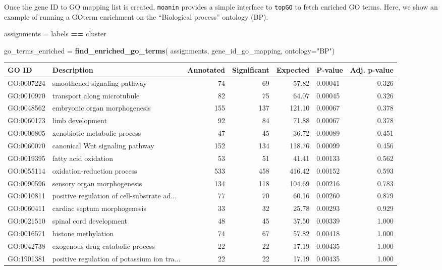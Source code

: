 \documentclass[9pt,a4paper,]{extarticle}
\newenvironment{Shaded}{\begin{snugshade}}{\end{snugshade}}
\newcommand{\DataTypeTok}[1]{\textcolor[rgb]{0.13,0.29,0.53}{#1}}
\newcommand{\KeywordTok}[1]{\textcolor[rgb]{0.13,0.29,0.53}{\textbf{#1}}}
\newcommand{\NormalTok}[1]{#1}
\newcommand{\OperatorTok}[1]{\textcolor[rgb]{0.81,0.36,0.00}{\textbf{#1}}}
\newcommand{\StringTok}[1]{\textcolor[rgb]{0.31,0.60,0.02}{#1}}
\begin{document}
Once the gene ID to GO mapping list is created, \texttt{moanin} provides a simple
interface to \texttt{topGO} to fetch enriched GO terms. Here, we show an example of
running a GOterm enrichment on the ``Biological process'' ontology (BP).

\begin{Shaded}
\begin{Highlighting}[]
\NormalTok{assignments =}\StringTok{ }\NormalTok{labels }\OperatorTok{==}\StringTok{ }\NormalTok{cluster}

\NormalTok{go_terms_enriched =}\StringTok{ }\KeywordTok{find_enriched_go_terms}\NormalTok{(}
\NormalTok{    assignments,}
\NormalTok{    gene_id_go_mapping, }\DataTypeTok{ontology=}\StringTok{"BP"}\NormalTok{)}
\end{Highlighting}
\end{Shaded}

\begin{tabular}{llrrrlr}
\toprule
GO ID & Description & Annotated & Significant & Expected & P-value & Adj. p-value\\
\midrule
GO:0007224 & smoothened signaling pathway & 74 & 69 & 57.82 & 0.00041 & 0.326\\
GO:0010970 & transport along microtubule & 82 & 75 & 64.07 & 0.00045 & 0.326\\
GO:0048562 & embryonic organ morphogenesis & 155 & 137 & 121.10 & 0.00067 & 0.378\\
GO:0060173 & limb development & 92 & 84 & 71.88 & 0.00067 & 0.378\\
GO:0006805 & xenobiotic metabolic process & 47 & 45 & 36.72 & 0.00089 & 0.451\\
\addlinespace
GO:0060070 & canonical Wnt signaling pathway & 152 & 134 & 118.76 & 0.00099 & 0.456\\
GO:0019395 & fatty acid oxidation & 53 & 51 & 41.41 & 0.00133 & 0.562\\
GO:0055114 & oxidation-reduction process & 533 & 458 & 416.42 & 0.00152 & 0.593\\
GO:0090596 & sensory organ morphogenesis & 134 & 118 & 104.69 & 0.00216 & 0.783\\
GO:0010811 & positive regulation of cell-substrate ad... & 77 & 70 & 60.16 & 0.00260 & 0.879\\
\addlinespace
GO:0060411 & cardiac septum morphogenesis & 33 & 32 & 25.78 & 0.00293 & 0.929\\
GO:0021510 & spinal cord development & 48 & 45 & 37.50 & 0.00339 & 1.000\\
GO:0016571 & histone methylation & 74 & 67 & 57.82 & 0.00418 & 1.000\\
GO:0042738 & exogenous drug catabolic process & 22 & 22 & 17.19 & 0.00435 & 1.000\\
GO:1901381 & positive regulation of potassium ion tra... & 22 & 22 & 17.19 & 0.00435 & 1.000\\
\bottomrule
\end{tabular}
\end{document}
